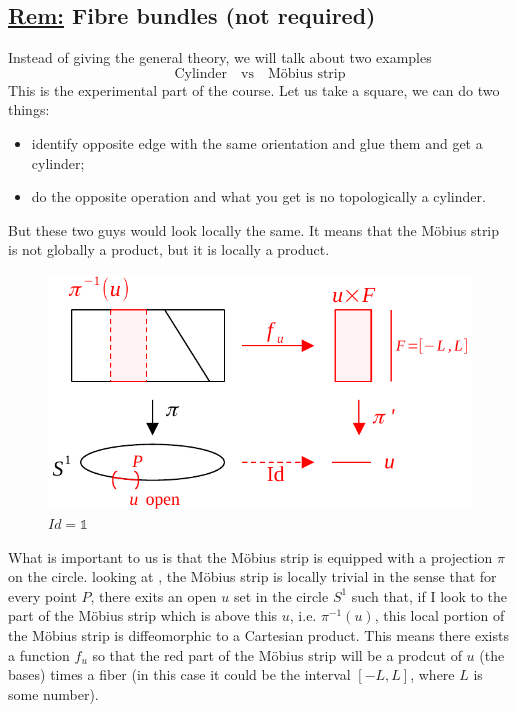 \documentclass[../main.tex]{subfiles}
\begin{document}
\subsection[Fibre bundles]{\underline{Rem:} Fibre bundles (not required)}
Instead of giving the general theory, we will talk about two examples
\[
\textrm{Cylinder} \quad \boxed{\textrm{vs}} \quad \textrm{Möbius strip}
\]
This is the experimental part of the course. Let us take a square, we can do two things:
\begin{itemize}
    \item identify opposite edge with the same orientation and glue them and get a cylinder;
    \item do the opposite operation and what you get is no topologically a cylinder.
\end{itemize}
But these two guys would look locally the same. It means that the Möbius strip is not globally a product, but it is locally a product. 
\begin{figure}[H]
	\includegraphics{images/Fiber_bundles.pdf}
	\caption[Fiber Bundles]{$Id=\mathbb{1}$}
\end{figure}
What is important to us is that the Möbius strip is equipped with a projection $\pi$ on the circle. looking at , the Möbius strip is locally trivial in the sense that for every point $P$, there exits an open $u$ set in the circle $S^1$ such that, if I look to the part of the Möbius strip which is above this $u$, i.e. $\pi^{-1}(u)$, this local portion of the Möbius strip is diffeomorphic to a Cartesian product. This means there exists a function $f_u$ so that the red part of the Möbius strip will be a prodcut of $u$ (the bases) times a fiber (in this case it could be the interval $\left[-L,L\right]$, where $L$ is some number).
\end{document}
